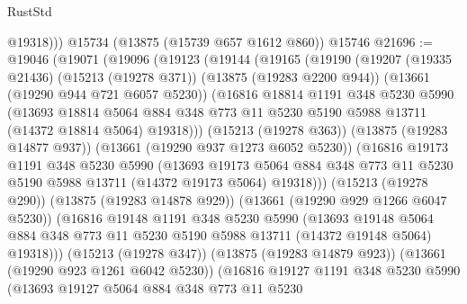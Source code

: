 \begin{lexlean}{RustStd}
\begin{coremodule}
          @19318)))
    @15734
    (@13875 (@15739 @657 @1612 @860))
    @15746
@21696 := @19046
    (@19071
      (@19096
        (@19123
          (@19144
            (@19165
              (@19190
                (@19207
                  (@19335 @21436)
                  (@15213 (@19278 @371))
                  (@13875 (@19283 @2200 @944))
                  (@13661 (@19290 @944 @721 @6057 @5230))
                  (@16816
                    @18814
                    @1191
                    @348
                    @5230
                    @5990
                    (@13693
                      @18814
                      @5064
                      @884
                      @348
                      @773
                      @11
                      @5230
                      @5190
                      @5988
                      @13711
                      (@14372 @18814 @5064)
                      @19318)))
                (@15213 (@19278 @363))
                (@13875 (@19283 @14877 @937))
                (@13661 (@19290 @937 @1273 @6052 @5230))
                (@16816
                  @19173
                  @1191
                  @348
                  @5230
                  @5990
                  (@13693
                    @19173
                    @5064
                    @884
                    @348
                    @773
                    @11
                    @5230
                    @5190
                    @5988
                    @13711
                    (@14372 @19173 @5064)
                    @19318)))
              (@15213 (@19278 @290))
              (@13875 (@19283 @14878 @929))
              (@13661 (@19290 @929 @1266 @6047 @5230))
              (@16816
                @19148
                @1191
                @348
                @5230
                @5990
                (@13693
                  @19148
                  @5064
                  @884
                  @348
                  @773
                  @11
                  @5230
                  @5190
                  @5988
                  @13711
                  (@14372 @19148 @5064)
                  @19318)))
            (@15213 (@19278 @347))
            (@13875 (@19283 @14879 @923))
            (@13661 (@19290 @923 @1261 @6042 @5230))
            (@16816
              @19127
              @1191
              @348
              @5230
              @5990
              (@13693
                @19127
                @5064
                @884
                @348
                @773
                @11
                @5230

\end{coremodule}
\end{lexlean}
